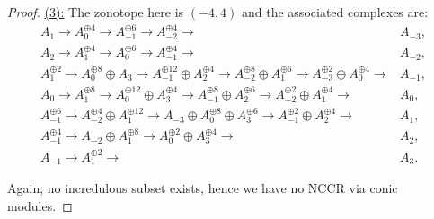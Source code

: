 \documentclass[10pt,a4paper]{amsart}
\begin{document}
\begin{proof}
    \underline{(3):} The zonotope here is $(-4,4)$ and the associated complexes are:
    \begin{align*}
        A_1\longrightarrow A_0^{\oplus 4}\longrightarrow A_{-1}^{\oplus 6}\longrightarrow A_{-2}^{\oplus 4}\longrightarrow &A_{-3},\\
        A_2\longrightarrow A_1^{\oplus 4}\longrightarrow A_0^{\oplus 6}\longrightarrow A_{-1}^{\oplus 4}\longrightarrow& A_{-2},\\
        A_1^{\oplus 2}\longrightarrow A_0^{\oplus 8}\oplus A_3\longrightarrow A_{-1}^{\oplus 12}\oplus A_2^{\oplus 4}\longrightarrow A_{-2}^{\oplus 8}\oplus A_1^{\oplus 6}\longrightarrow A_{-3}^{\oplus 2}\oplus A_0^{\oplus 4}\longrightarrow & A_{-1},\\
        A_0\longrightarrow A_1^{\oplus 8}\longrightarrow A_0^{\oplus 12}\oplus A_3^{\oplus 4}\longrightarrow A_{-1}^{\oplus 8}\oplus A_2^{\oplus 6} \longrightarrow A_{-2}^{\oplus 2}\oplus A_1^{\oplus 4}\longrightarrow & A_0,\\
        A_{-1}^{\oplus 6}\longrightarrow A_{-2}^{\oplus 4}\oplus A_1^{\oplus 12}\longrightarrow A_{-3}\oplus A_0^{\oplus 8}\oplus A_3^{\oplus 6}\longrightarrow A_{-1}^{\oplus 2}\oplus A_2^{\oplus 4}\longrightarrow & A_1,\\
        A_{-1}^{\oplus 4}\longrightarrow A_{-2} \oplus A_1^{\oplus 8}\longrightarrow A_0^{\oplus 2}\oplus A_3^{\oplus 4}\longrightarrow & A_2,\\
        A_{-1}\longrightarrow A_1^{\oplus 2}\longrightarrow&  A_3.
    \end{align*}

    Again, no incredulous subset exists, hence we have no NCCR via conic modules.
\end{proof}
\end{document}
